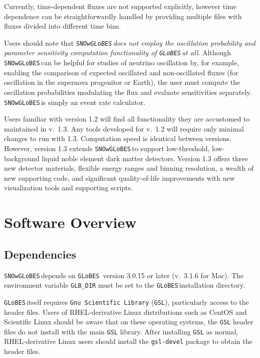 \documentclass{article}
\newcommand{\snow}{\texttt{SNOwGLoBES}\,}
\newcommand{\glb}{\texttt{GLoBES}\,}
\begin{document}
Currently, time-dependent fluxes are not supported explicitly, however time dependence can be straightforwardly handled by providing multiple files with fluxes divided into different time bins.

Users should note that \textit{\snow does not employ the oscillation probability and parameter sensitivity computation functionality of \glb at all}.  Although \snow can be helpful for studies of neutrino oscillation by, for example, enabling the comparison of expected  oscillated and non-oscillated fluxes (for oscillation in the supernova progenitor or Earth), the user must compute the oscillation probabilities modulating the flux and evaluate sensitivities separately. \snow is simply an event rate calculator.

Users familiar with version 1.2 will find all functionality they are accustomed to maintained in v.~1.3. Any tools developed for v.~1.2 will require only minimal changes to run with 1.3. Computation speed is identical between versions. However, version 1.3 extends \snow to support low-threshold, low-background liquid noble element dark matter detectors. Version 1.3 offers three new detector materials, flexible energy ranges and binning resolution, a wealth of new supporting code, and significant quality-of-life improvements with new visualization tools and supporting scripts.


\section{Software Overview} \label{sec:soft.overview}

\subsection{Dependencies}
\snow depends on \glb \cite{globes} version 3.0.15 or later (v.~3.1.6 for Mac). The environment variable \texttt{GLB\_DIR} must be set to the \glb installation directory.

\glb itself requires \texttt{Gnu Scientific Library} (\texttt{GSL}), particularly access to the header files. Users of RHEL-derivative Linux distributions such as CentOS and Scientific Linux should be aware that on these operating systems, the \texttt{GSL} header files do not install with the main \texttt{GSL} library. After installing \texttt{GSL} as normal, RHEL-derivative Linux users should install the \texttt{gsl-devel} package to obtain the header files.
\end{document}

